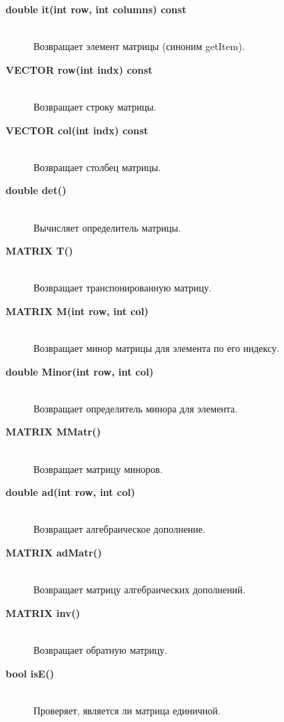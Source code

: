 \documentclass{article}
\begin{document}
\begin{description}
    \item[\textbf{double it(int row, int columns) const}] \hfill \\
    Возвращает элемент матрицы (синоним getItem).
    
    \item[\textbf{VECTOR row(int indx) const}] \hfill \\
    Возвращает строку матрицы.
    
    \item[\textbf{VECTOR col(int indx) const}] \hfill \\
    Возвращает столбец матрицы.
    
    \item[\textbf{double det()}] \hfill \\
    Вычисляет определитель матрицы.
    
    \item[\textbf{MATRIX T()}] \hfill \\
    Возвращает транспонированную матрицу.
    
    \item[\textbf{MATRIX M(int row, int col)}] \hfill \\
    Возвращает минор матрицы для элемента по его индексу.
    
    \item[\textbf{double Minor(int row, int col)}] \hfill \\
    Возвращает определитель минора для элемента.
    
    \item[\textbf{MATRIX MMatr()}] \hfill \\
    Возвращает матрицу миноров.
    
    \item[\textbf{double ad(int row, int col)}] \hfill \\
    Возвращает алгебраическое дополнение.
    
    \item[\textbf{MATRIX adMatr()}] \hfill \\
    Возвращает матрицу алгебраических дополнений.
    
    \item[\textbf{MATRIX inv()}] \hfill \\
    Возвращает обратную матрицу.
    
    \item[\textbf{bool isE()}] \hfill \\
    Проверяет, является ли матрица единичной.
    

\end{description}
\end{document}

